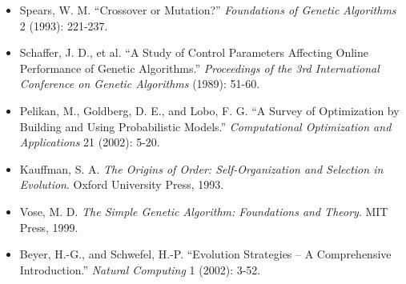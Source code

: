 \documentclass[a4paper, 11pt]{article}
\begin{document}
\begin{itemize}
\item Spears, W. M. ``Crossover or Mutation?'' \textit{Foundations of Genetic Algorithms} 2 (1993): 221-237.
\item Schaffer, J. D., et al. ``A Study of Control Parameters Affecting Online Performance of Genetic Algorithms.'' \textit{Proceedings of the 3rd International Conference on Genetic Algorithms} (1989): 51-60.
\item Pelikan, M., Goldberg, D. E., and Lobo, F. G. ``A Survey of Optimization by Building and Using Probabilistic Models.'' \textit{Computational Optimization and Applications} 21 (2002): 5-20.
\item Kauffman, S. A. \textit{The Origins of Order: Self-Organization and Selection in Evolution}. Oxford University Press, 1993.
\item Vose, M. D. \textit{The Simple Genetic Algorithm: Foundations and Theory}. MIT Press, 1999.
\item Beyer, H.-G., and Schwefel, H.-P. ``Evolution Strategies -- A Comprehensive Introduction.'' \textit{Natural Computing} 1 (2002): 3-52.
\end{itemize}
\end{document}
